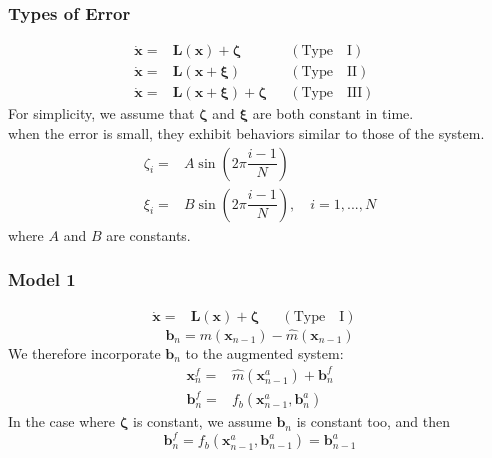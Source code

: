 \documentclass{beamer}
\begin{document}
\begin{frame}
\frametitle{Types of Error}
\begin{align*} 
\dot{\pmb{x}}=&\pmb{L}(\pmb{x})+\pmb{\zeta} 
&&\mathrm{(Type\quad I)}& \\
\dot{\pmb{x}}=&\pmb{L}(\pmb{x}+\pmb{\xi}) 
&&\mathrm{(Type\quad II)}& \\
\dot{\pmb{x}}=&\pmb{L}(\pmb{x}+\pmb{\xi})+\pmb{\zeta} 
&&\mathrm{(Type\quad III)}&
\end{align*}
For simplicity, we assume that $\pmb{\zeta}$ and $\pmb{\xi}$ are both constant in time.\\
when the error is small, they exhibit behaviors similar to those of the system.
\begin{align*}
\zeta_i=&A\sin(2\pi\dfrac{i-1}{N})\\
\xi_i=&B\sin(2\pi\dfrac{i-1}{N}),\quad i=1,...,N
\end{align*}
where $A$ and $B$ are constants.
\end{frame}

\begin{frame}
\frametitle{Model 1}
\begin{align*} 
\dot{\pmb{x}}=&\pmb{L}(\pmb{x})+\pmb{\zeta} 
&&\mathrm{(Type\quad I)}&
\end{align*}
\begin{equation*}
\pmb{b}_{n}=m(\pmb{x}_{n-1})-\hat{m}(\pmb{x}_{n-1})
\end{equation*}
We therefore incorporate $\pmb{b}_n$ to the augmented system:
\begin{align*}
\pmb{x}_{n}^{f}=&\hat{m}(\pmb{x}_{n-1}^{a})+\pmb{b}_{n}^{f}\\
\pmb{b}_{n}^{f}=&f_{b}(\pmb{x}_{n-1}^{a},\pmb{b}_{n}^{a})
\end{align*}
In the case where $\pmb{\zeta}$ is constant, we assume $\pmb{b}_n$ is constant too, and then
\begin{equation*}
\pmb{b}_{n}^{f}=f_{b}(\pmb{x}_{n-1}^{a},\pmb{b}_{n-1}^{a})=\pmb{b}_{n-1}^{a}
\end{equation*}
\end{frame}
\end{document}
